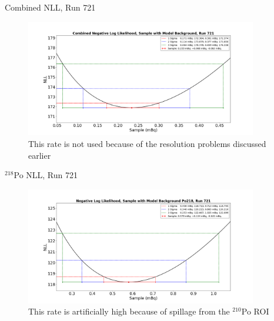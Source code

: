 \documentclass[aspectratio=169]{beamer}
\begin{document}
\begin{frame}{Combined NLL, Run 721}
    \begin{figure}
        \begin{center}
            \includegraphics[width=0.9\textwidth]
            {assets/721/comNLL.png}
            \caption{This rate is not used because of the resolution problems discussed earlier}
        \end{center}
    \end{figure}
\end{frame}

\begin{frame}{$^{218}$Po NLL, Run 721}
    \begin{figure}
        \begin{center}
            \includegraphics[width=0.9\textwidth]
            {assets/721/NLL218.png}
            \caption{This rate is artificially high because of spillage from the $^{210}$Po ROI}
        \end{center}
    \end{figure}
\end{frame}
\end{document}
